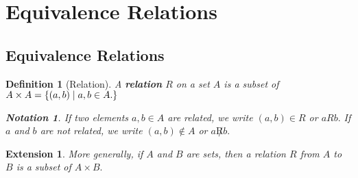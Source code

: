 \documentclass[12pt,a4paper]{article}
\newtheorem{nota}{Notation}[section]
\newtheorem{df}{Definition}[subsection]
\newtheorem*{ext}{\indent Extension}
\begin{document}
\newpage
\section{Equivalence Relations}
\subsection{Equivalence Relations}
\begin{df}[Relation]
	A \textbf{relation} $R$	 on a set $A$ is a subset of $A\times A=\qty{\qty(a,b)\mid a,b\in A.}$ 
\begin{nota}
	If two elements $a,b\in A$ are related, we write $(a,b)\in R$ or $aRb.$ If $a$ and $b$ are not related, we write $(a,b)\notin A$ or $a\not Rb.$
\end{nota}
\end{df}
\begin{ext} More generally, if $A$ and $B$ are sets, then a relation $R$ from $A$ to $B$ is a subset of $A\times B.$\end{ext}
\end{document}
